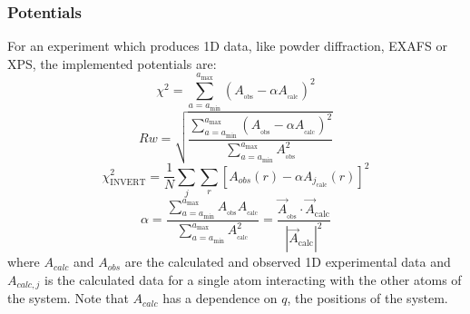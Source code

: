 \subsubsection{Potentials}
For an experiment which produces 1D data, like powder diffraction, EXAFS or XPS, the implemented potentials are:
\begin{equation} \label{chi}
\chi^{2} =
\sum_{a=a_\mathrm{min}}^{a_\mathrm{max}} \left(A_{_\mathrm{obs}} - \alpha A_{_\mathrm{calc}}\right)^{2}
\end{equation}
\begin{equation}\label{Rw}
Rw =
\sqrt{\frac{\sum_{a=a_\mathrm{min}}^{a_\mathrm{max}} \left(A_{_\mathrm{obs}} - \alpha A_{_\mathrm{calc}}\right)^{2}}{\sum_{a=a_\mathrm{min}}^{a_\mathrm{max}} A_{_\mathrm{obs}}^{2}}}
\end{equation}
\begin{equation}\label{INVERT}
  \chi^{2}_{\mathrm{INVERT}} = \frac{1}{N}\sum_{j}\sum_{r}[A_{obs}(r) - \alpha A_{j_\mathrm{calc}}(r)]^{2}
\end{equation}
\begin{equation} \label{alpha}
\alpha  = \frac{\sum_{a=a_\mathrm{min}}^{a_\mathrm{max}}A_\mathrm{_\mathrm{obs}}A_{_\mathrm{calc}}}{\sum_{a=a_\mathrm{min}}^{a_\mathrm{max}} A_{_\mathrm{calc}}^{2}} = \frac{\vec{A}_{_\mathrm{obs}}\cdot\vec{A}_\mathrm{calc}}{|\vec{A}_\mathrm{calc}|^{2}}
\end{equation}
where $A_{calc}$ and $A_{obs}$ are the calculated and observed 1D experimental data
and $A_{calc, j}$ is the calculated data for a single atom interacting with the other atoms of the system.
Note that $A_{calc}$ has a dependence on $q$, the positions of the system.

